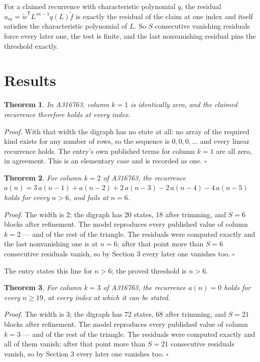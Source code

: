 \documentclass[11pt]{article}
\newtheorem{theorem}{Theorem}
\theoremstyle{definition}
\begin{document}
For a claimed recurrence with characteristic polynomial $q$, the residual $u_m = \tilde w^{\mathsf T}L^{\,m-1}q(L)\tilde f$ is exactly the residual of the claim at one index and itself satisfies the characteristic polynomial of $L$. So $S$ consecutive vanishing residuals force every later one, the test is finite, and the last nonvanishing residual pins the threshold exactly.

\section{Results}

\begin{theorem} In A316763, column $k = 1$ is identically zero, and the claimed recurrence therefore holds at every index.\end{theorem}

{\itshape Proof.} With that width the digraph has no state at all: no array of the required kind exists for any number of rows, so the sequence is $0,0,0,\dots$ and every linear recurrence holds. The entry's own published terms for column $k = 1$ are all zero, in agreement. This is an elementary case and is recorded as one. $\square$

\begin{theorem} For column $k = 2$ of A316763, the recurrence $a(n) = 3\,a(n-1) + a(n-2) + 2\,a(n-3) - 2\,a(n-4) - 4\,a(n-5)$ holds for every $n > 6$, and fails at $n = 6$.\end{theorem}

{\itshape Proof.} The width is $2$; the digraph has $20$ states, $18$ after trimming, and $S = 6$ blocks after refinement. The model reproduces every published value of column $k = 2$ --- and of the rest of the triangle. The residuals were computed exactly and the last nonvanishing one is at $n = 6$; after that point more than $S = 6$ consecutive residuals vanish, so by Section 3 every later one vanishes too. $\square$

The entry states this line for $n > 6$; the proved threshold is $n > 6$.

\begin{theorem} For column $k = 3$ of A316763, the recurrence $a(n) = 0$ holds for every $n \ge 19$, at every index at which it can be stated.\end{theorem}

{\itshape Proof.} The width is $3$; the digraph has $72$ states, $68$ after trimming, and $S = 21$ blocks after refinement. The model reproduces every published value of column $k = 3$ --- and of the rest of the triangle. The residuals were computed exactly and all of them vanish; after that point more than $S = 21$ consecutive residuals vanish, so by Section 3 every later one vanishes too. $\square$
\end{document}
